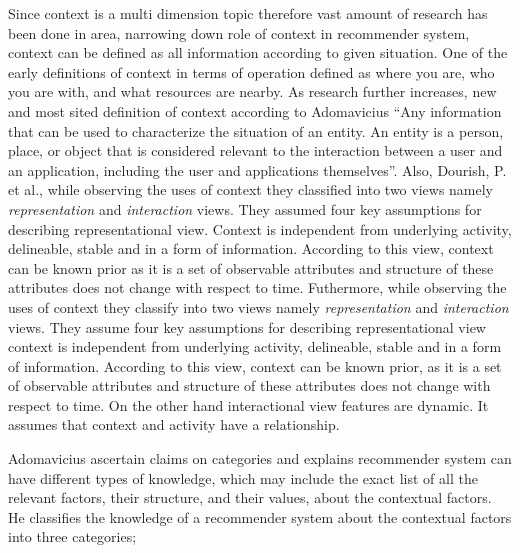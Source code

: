 Since context is a multi dimension topic therefore vast amount of research has been done in area, narrowing down role of context in recommender system, context can be defined as all information according to given situation. One of the early definitions of context in terms of operation \cite{schilit1994disseminating} defined as where you are, who you are with, and what resources are nearby.  As research further increases, new and most sited definition of context according to Adomavicius \cite{adomavicius2011context} “Any information  that  can  be  used  to characterize  the  situation  of  an entity.  An entity is a person, place, or object that is considered relevant to the interaction between a user and an application, including the user and applications  themselves”. Also, Dourish, P. et al., \cite{dourish2004we} while observing the uses of context they classified into two views namely \textit{representation} and \textit{ interaction } views. They assumed four key assumptions for describing representational view. Context is independent from underlying activity, delineable, stable and in a form of information. According to this view, context can be known prior as it is a set of observable attributes and structure of these attributes does not change with respect to  time. Futhermore, \cite{dourish2004we} while observing the uses of context they classify into two views namely \textit{ representation } and \textit{ interaction } views. They assume four key assumptions for describing representational view context is independent from underlying activity, delineable, stable and in a form of information. According to this view, context can be known prior, as it is a set of observable attributes and structure of these attributes does not change with respect to time. On the other hand interactional view features are dynamic. It assumes that context and activity have a relationship.\newline

Adomavicius \cite{adomavicius2011context} ascertain \cite{dourish2004we} claims on categories  and  explains recommender system can have different types of knowledge, which may include the exact list of all the relevant factors, their structure, and their values, about the contextual factors. He classifies the knowledge of a recommender system about the contextual factors into three categories; \newline

